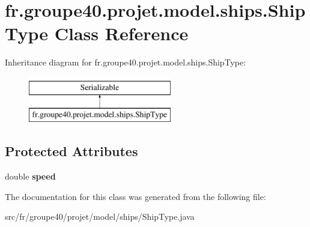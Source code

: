 \hypertarget{classfr_1_1groupe40_1_1projet_1_1model_1_1ships_1_1_ship_type}{}\section{fr.\+groupe40.\+projet.\+model.\+ships.\+Ship\+Type Class Reference}
\label{classfr_1_1groupe40_1_1projet_1_1model_1_1ships_1_1_ship_type}
Inheritance diagram for fr.\+groupe40.\+projet.\+model.\+ships.\+Ship\+Type\+:\begin{figure}[H]
\begin{center}
\leavevmode
\includegraphics[height=2.000000cm]{classfr_1_1groupe40_1_1projet_1_1model_1_1ships_1_1_ship_type}
\end{center}
\end{figure}
\subsection*{Protected Attributes}
\begin{DoxyCompactItemize}
\item 
\mbox{\label{classfr_1_1groupe40_1_1projet_1_1model_1_1ships_1_1_ship_type_a1b9a8c6f8feb78937126e77eee96fa4f}} 
double {\bfseries speed}
\end{DoxyCompactItemize}


The documentation for this class was generated from the following file\+:\begin{DoxyCompactItemize}
\item 
src/fr/groupe40/projet/model/ships/Ship\+Type.\+java\end{DoxyCompactItemize}
